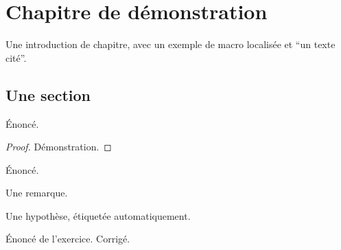 %

\chapter{Chapitre de démonstration}
\begin{chapterintro}
    Une introduction de chapitre, avec \ie un exemple de macro localisée et
    \enquote{un texte cité}.
\end{chapterintro}
\section{Une section}

\begin{theorem}[title={Un théorème}, label=thm:demo]%
    Énoncé.
\end{theorem}

\begin{proof}
    Démonstration.
\end{proof}

\begin{definition}[title={Une définition}]%
    Énoncé.
\end{definition}

\begin{remark}
    Une remarque.
\end{remark}

\begin{assumption}
    Une hypothèse, étiquetée automatiquement.
\end{assumption}

\begin{exercise}[points=4]
    Énoncé de l'exercice.
\solution
    Corrigé.
\end{exercise}

